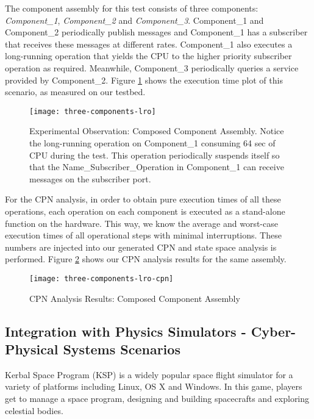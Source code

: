 
The component assembly for this test consists of three components: \emph{Component\_1}, \emph{Component\_2} and \emph{Component\_3}. Component\_1 and Component\_2 periodically publish messages and Component\_1 has a subscriber that receives these messages at different rates. Component\_1 also executes a long-running operation that yields the CPU to the higher priority subscriber operation as required. Meanwhile, Component\_3 periodically queries a service provided by Component\_2. Figure \ref{fig:three-components-lro} shows the execution time plot of this scenario, as measured on our testbed. 

\begin{figure}[h]
	\centering
	\texttt{[image: three-components-lro]}
	\caption{Experimental Observation: Composed Component Assembly. Notice the long-running operation on Component\_1 consuming 64 sec of CPU during the test. This operation periodically suspends itself so that the Name\_Subscriber\_Operation in Component\_1 can receive messages on the subscriber port.}
	\label{fig:three-components-lro}
\end{figure}
\FloatBarrier

For the CPN analysis, in order to obtain pure execution times of all these operations, each operation on each component is executed as a stand-alone function on the hardware. This way, we know the average and worst-case execution times of all operational steps with minimal interruptions. These numbers are injected into our generated CPN and state space analysis is performed. Figure \ref{fig:three-components-lro-cpn} shows our CPN analysis results for the same assembly.


\begin{figure}[h]
	\centering
	\texttt{[image: three-components-lro-cpn]}
	\caption{CPN Analysis Results: Composed Component Assembly}
	\label{fig:three-components-lro-cpn}
\end{figure}
\FloatBarrier

\subsection{Integration with Physics Simulators - Cyber-Physical Systems Scenarios}

Kerbal Space Program \cite{KSP} (KSP) is a widely popular space flight simulator for a variety of platforms including Linux, OS X and Windows. In this game, players get to manage a space program, designing and building spacecrafts and exploring celestial bodies. 

